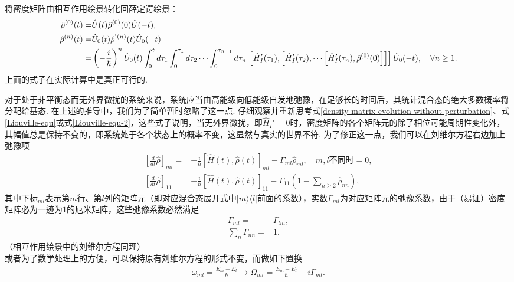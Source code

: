 \documentclass{assignment}
\begin{document}
将密度矩阵由相互作用绘景转化回薛定谔绘景：
\begin{align}
    \hat{\rho}^{(0)}(t)=&\hat{U}(t)\hat{\rho}^{(0)}(0)\hat{U}(-t),\\
    \label{density-matrix-evolution-3}\notag\hat{\rho}^{(n)}(t)=&\hat{U}_0(t)\hat{\rho}^{'(n)}(t)\hat{U}_0(-t)\\
    =&\left(-\frac{i}{\hbar}\right)^n\hat{U}_0(t)\int_0^td\tau_1\int_0^{\tau_1}d\tau_2\cdots\int_0^{\tau_{n-1}}d\tau_n\,\left[\hat{H}_I'(\tau_1),\left[\hat{H}_I'(\tau_2),\cdots\left[\hat{H}_I'(\tau_n),\hat{\rho}^{(0)}(0)\right]\right]\right]\hat{U}_0(-t),\quad\forall n\geq 1.
\end{align}
上面的式子在实际计算中是真正可行的.

对于处于非平衡态而无外界微扰的系统来说，系统应当由高能级向低能级自发地弛豫，在足够长的时间后，其统计混合态的绝大多数概率将分配给基态. 在上述的推导中，我们为了简单暂时忽略了这一点. 仔细观察并重新思考式\eqref{density-matrix-evolution-without-perturbation}、式\eqref{Liouville-equ}或式\eqref{Liouville-equ-2}，这些式子说明，当无外界微扰，即$\hat{H}_I'=0$时，密度矩阵的各个矩阵元的除了相位可能周期性变化外，其幅值总是保持不变的，即系统处于各个状态上的概率不变，这显然与真实的世界不符. 为了修正这一点，我们可以在刘维尔方程右边加上弛豫项
\begin{align}
    \left[\frac{d}{dt}\hat{\rho}\right]_{ml}=&-\frac{i}{\hbar}[\hat{H}(t),\hat{\rho}(t)]_{ml}-\Gamma_{ml}\hat{\rho}_{ml},\quad m,l\text{不同时}=0,\\
    \left[\frac{d}{dt}\hat{\rho}\right]_{11}=&-\frac{i}{\hbar}[\hat{H}(t),\hat{\rho}(t)]_{11}-\Gamma_{11}\left(1-\sum_{n\geq 2}\hat{\rho}_{nn}\right),
\end{align}
其中下标$_{ml}$表示第$m$行、第$l$列的矩阵元（即对应混合态展开式中$\lvert m\rangle\langle l\rvert$前面的系数），实数$\Gamma_{ml}$为对应矩阵元的弛豫系数，由于（易证）密度矩阵必为一迹为$1$的厄米矩阵，这些弛豫系数必然满足
\begin{align}
    \Gamma_{ml}=&\Gamma_{lm},\\
    \sum_n\Gamma_{nn}=&1.
\end{align}
（相互作用绘景中的刘维尔方程同理）\\
或者为了数学处理上的方便，可以保持原有刘维尔方程的形式不变，而做如下置换
\begin{align}
    \omega_{ml}=\frac{E_m-E_l}{\hbar}\longrightarrow\tilde{\Omega}_{ml}=\frac{E_m-E_l}{\hbar}-i\Gamma_{ml}.
\end{align}
\end{document}
